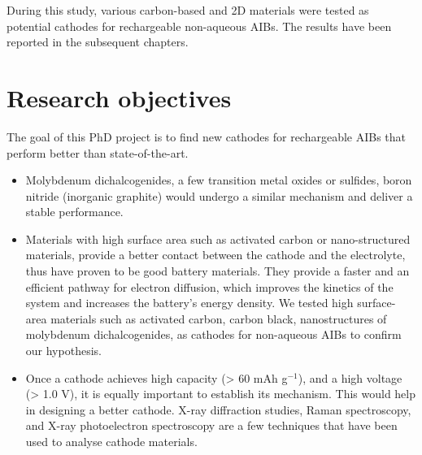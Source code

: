 During this study, various carbon-based and 2D materials were tested as potential cathodes for rechargeable non-aqueous AIBs. The results have been reported in the subsequent chapters.

\section{Research objectives}
The goal of this PhD project is to find new cathodes for rechargeable AIBs that perform better than state-of-the-art. 
\begin{itemize}
    \item Molybdenum dichalcogenides, a few transition metal oxides or sulfides, boron nitride (inorganic graphite) would undergo a similar mechanism and deliver a stable performance. 
    
    \item Materials with high surface area such as activated carbon or nano-structured materials, provide a better contact between the cathode and the electrolyte, thus have proven to be good battery materials. They provide a faster and an efficient pathway for electron diffusion, which improves the kinetics of the system and increases the battery's energy density. We tested high surface-area materials such as activated carbon, carbon black, nanostructures of molybdenum dichalcogenides, as cathodes for non-aqueous AIBs to confirm our hypothesis.
    
    \item Once a cathode achieves high capacity (> 60 mAh g$^{-1}$), and a high voltage (> 1.0 V), it is equally important to establish its mechanism. This would help in designing a better cathode. X-ray diffraction studies, Raman spectroscopy, and X-ray photoelectron spectroscopy are a few techniques that have been used to analyse cathode materials. 

\end{itemize}






